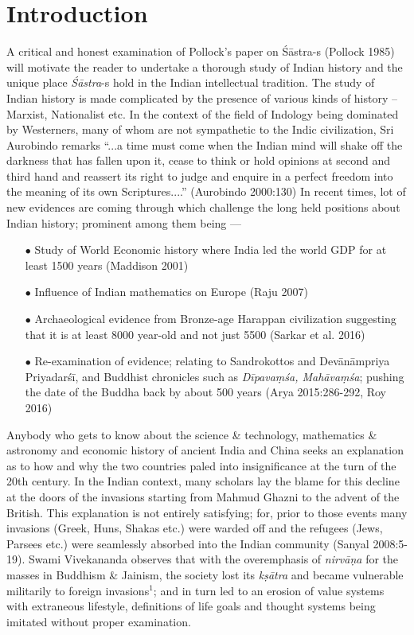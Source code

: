 \section{Introduction}\label{art12-sec1}

A critical and honest examination of Pollock's paper on Śāstra-s (Pollock 1985) will motivate the reader to undertake a thorough study of Indian history and the unique place {\sl Śāstra}-s hold in the Indian intellectual tradition. The study of Indian history is made complicated by the presence of various kinds of history -- Marxist, Nationalist etc. In the context of the ﬁeld of Indology being dominated by Westerners, many of whom are not sympathetic to the Indic civilization, Sri Aurobindo remarks ``...a time must come when the Indian mind will shake off the darkness that has fallen upon it, cease to think or hold opinions at second and third hand and reassert its right to judge and enquire in a perfect freedom into the meaning of its own Scriptures....'' (Aurobindo 2000:130) In recent times, lot of new evidences are coming through which challenge the long held positions about Indian history; prominent among them being ---
\begin{itemize}
\item[$\bullet$] Study of World Economic history where India led the world GDP for at least 1500 years (Maddison 2001)

\item[$\bullet$] Inﬂuence of Indian mathematics on Europe (Raju 2007)

\item[$\bullet$] Archaeological evidence from Bronze-age Harappan civilization suggesting that it is at least 8000 year-old and not just 5500 (Sarkar et al. 2016)

\item[$\bullet$] Re-examination of evidence; relating to Sandrokottos and Devānāmpriya Priyadarśī, and Buddhist chronicles such as {\sl Dīpavaṃśa, Mahāvaṃśa}; pushing the date of the Buddha back by about 500 years (Arya 2015:286-292, Roy 2016)
\end{itemize}

Anybody who gets to know about the science \& technology, mathematics \& astronomy and economic history of ancient India and China seeks an explanation as to how and why the two countries paled into insigniﬁcance at the turn of the 20th century. In the Indian context, many scholars lay the blame for this decline at the doors of the invasions starting from Mahmud Ghazni to the advent of the British. This explanation is not entirely satisfying; for, prior to those events many invasions (Greek, Huns, Shakas etc.) were warded off and the refugees (Jews, Parsees etc.) were seamlessly absorbed into the Indian community (Sanyal 2008:5-19). Swami Vivekananda observes that with the overemphasis of {\sl nirvāṇa} for the masses in Buddhism \& Jainism, the society lost its {\sl kṣātra} and became vulnerable militarily to foreign invasions$^{1}$; and in turn led to an erosion of value systems with extraneous lifestyle, definitions of life goals and thought systems being imitated without proper examination. 

